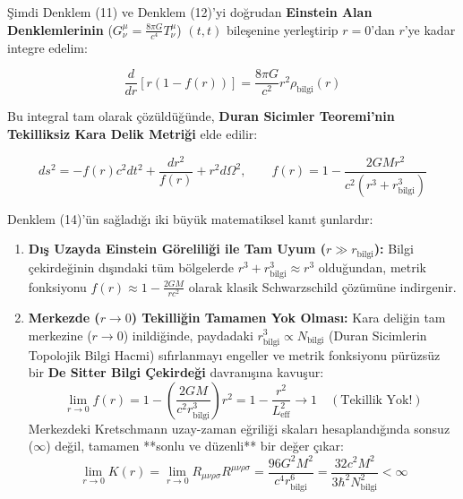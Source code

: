 \documentclass[12pt,a4paper]{article}
\begin{document}
Şimdi Denklem (11) ve Denklem (12)'yi doğrudan \textbf{Einstein Alan Denklemlerinin} ($G^\mu_\nu = \frac{8\pi G}{c^4} T^\mu_\nu$) $(t,t)$ bileşenine yerleştirip $r=0$'dan $r$'ye kadar integre edelim:

\begin{equation}
\frac{d}{dr} \left[ r \left( 1 - f(r) \right) \right] = \frac{8\pi G}{c^2} r^2 \rho_{\text{bilgi}}(r)
\end{equation}

Bu integral tam olarak çözüldüğünde, \textbf{Duran Sicimler Teoremi'nin Tekilliksiz Kara Delik Metriği} elde edilir:

\begin{equation}
ds^2 = -f(r) c^2 dt^2 + \frac{dr^2}{f(r)} + r^2 d\Omega^2, \qquad f(r) = 1 - \frac{2GM r^2}{c^2 \left( r^3 + r_{\text{bilgi}}^3 \right)}
\end{equation}

Denklem (14)'ün sağladığı iki büyük matematiksel kanıt şunlardır:

\begin{enumerate}
    \item \textbf{Dış Uzayda Einstein Göreliliği ile Tam Uyum ($r \gg r_{\text{bilgi}}$):} Bilgi çekirdeğinin dışındaki tüm bölgelerde $r^3 + r_{\text{bilgi}}^3 \approx r^3$ olduğundan, metrik fonksiyonu $f(r) \approx 1 - \frac{2GM}{rc^2}$ olarak klasik Schwarzschild çözümüne indirgenir.
    \item \textbf{Merkezde ($r \to 0$) Tekilliğin Tamamen Yok Olması:} Kara deliğin tam merkezine ($r \to 0$) inildiğinde, paydadaki $r_{\text{bilgi}}^3 \propto N_{\text{bilgi}}$ (Duran Sicimlerin Topolojik Bilgi Hacmi) sıfırlanmayı engeller ve metrik fonksiyonu pürüzsüz bir \textbf{De Sitter Bilgi Çekirdeği} davranışına kavuşur:
    \begin{equation}
    \lim_{r \to 0} f(r) = 1 - \left( \frac{2GM}{c^2 r_{\text{bilgi}}^3} \right) r^2 = 1 - \frac{r^2}{L_{\text{eff}}^2} \longrightarrow 1 \quad (\text{Tekillik Yok!})
    \end{equation}
    Merkezdeki Kretschmann uzay-zaman eğriliği skaları hesaplandığında sonsuz ($\infty$) değil, tamamen **sonlu ve düzenli** bir değer çıkar:
    \begin{equation}
    \lim_{r \to 0} K(r) = \lim_{r \to 0} R_{\mu\nu\rho\sigma}R^{\mu\nu\rho\sigma} = \frac{96 G^2 M^2}{c^4 r_{\text{bilgi}}^6} = \frac{32 c^2 M^2}{3 \hbar^2 N_{\text{bilgi}}^2} < \infty
    \end{equation}
\end{enumerate}
\end{document}
